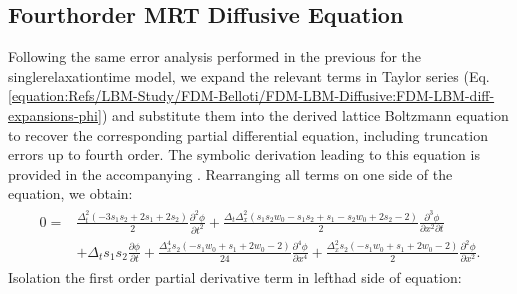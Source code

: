 \documentclass[letterpaper,10pt,english,openany,oneside]{jupyterBook}
\begin{document}
\subsection{Fourth\sphinxhyphen{}order MRT Diffusive Equation}
\label{\detokenize{Refs/LBM-Study/FDM-Belloti/FDM-LBM-Diffusive:fourth-order-mrt-diffusive-equation}}
\sphinxAtStartPar
Following the same error analysis performed in the previous {\hyperref[\detokenize{Refs/LBM-Study/FDM-Belloti/FDM-LBM-Diffusive:convergence-errors-mrt-diffusive-fourth-order}]{}} for the single\sphinxhyphen{}relaxation\sphinxhyphen{}time model, we expand the relevant terms in Taylor series (Eq. \eqref{equation:Refs/LBM-Study/FDM-Belloti/FDM-LBM-Diffusive:FDM-LBM-diff-expansions-phi}) and substitute them into the derived lattice Boltzmann equation to recover the corresponding partial differential equation, including truncation errors up to fourth order. The symbolic derivation leading to this equation is provided in the accompanying . Rearranging all terms on one side of the equation, we obtain:
\begin{equation*}
\begin{split}
\begin{array}{ll}
0=&\displaystyle\frac{\Delta_{t}^{2} \left(- 3 s_{1} s_{2} + 2 s_{1} + 2 s_{2}\right)}{2} \frac{\partial^{2}\phi}{\partial t^{2}}  + \frac{\Delta_{t} \Delta_{x}^{2} \left(s_{1} s_{2} w_{0} - s_{1} s_{2} + s_{1} - s_{2} w_{0} + 2 s_{2} - 2\right)}{2} \frac{\partial^{3}\phi}{\partial x^{2}\partial t} \\
&+ \Delta_{t} s_{1} s_{2} \displaystyle\frac{\partial \phi}{\partial t} + \frac{\Delta_{x}^{4} s_{2} \left(- s_{1} w_{0} + s_{1} + 2 w_{0} - 2\right)}{24} \frac{\partial^{4}\phi}{\partial x^{4}} + \frac{\Delta_{x}^{2} s_{2} \left(- s_{1} w_{0} + s_{1} + 2 w_{0} - 2\right)}{2} \frac{\partial^{2}\phi}{\partial x^{2}}.
\end{array}
\end{split}
\end{equation*}
\sphinxAtStartPar
Isolation the first order partial derivative term in left\sphinxhyphen{}had side of equation:
\end{document}

